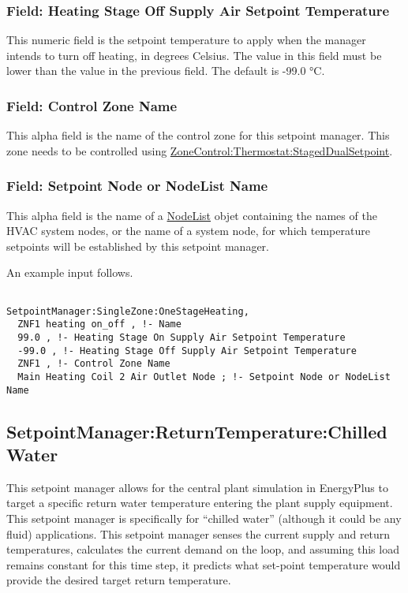 \subsubsection{Field: Heating Stage Off Supply Air Setpoint Temperature}\label{field-heating-stage-off-supply-air-setpoint-temperature}

This numeric field is the setpoint temperature to apply when the manager intends to turn off heating, in degrees Celsius. The value in this field must be lower than the value in the previous field. The default is -99.0 °C.

\subsubsection{Field: Control Zone Name}\label{field-control-zone-name-4}

This alpha field is the name of the control zone for this setpoint manager. This zone needs to be controlled using \hyperref[zonecontrolthermostatstageddualsetpoint]{ZoneControl:Thermostat:StagedDualSetpoint}.

\subsubsection{Field: Setpoint Node or NodeList Name}\label{field-setpoint-node-or-nodelist-name-21}

This alpha field is the name of a \hyperref[nodelist]{NodeList} objet containing the names of the HVAC system nodes, or the name of a system node, for which temperature setpoints will be established by this setpoint manager.

An example input follows.

\begin{lstlisting}

SetpointManager:SingleZone:OneStageHeating,
  ZNF1 heating on_off , !- Name
  99.0 , !- Heating Stage On Supply Air Setpoint Temperature
  -99.0 , !- Heating Stage Off Supply Air Setpoint Temperature
  ZNF1 , !- Control Zone Name
  Main Heating Coil 2 Air Outlet Node ; !- Setpoint Node or NodeList Name
\end{lstlisting}

\subsection{SetpointManager:ReturnTemperature:ChilledWater}\label{setpointmanagerreturntemperaturechilledwater}

This setpoint manager allows for the central plant simulation in EnergyPlus to target a specific return water temperature entering the plant supply equipment. This setpoint manager is specifically for ``chilled water'' (although it could be any fluid) applications. This setpoint manager senses the current supply and return temperatures, calculates the current demand on the loop, and assuming this load remains constant for this time step, it predicts what set-point temperature would provide the desired target return temperature.

